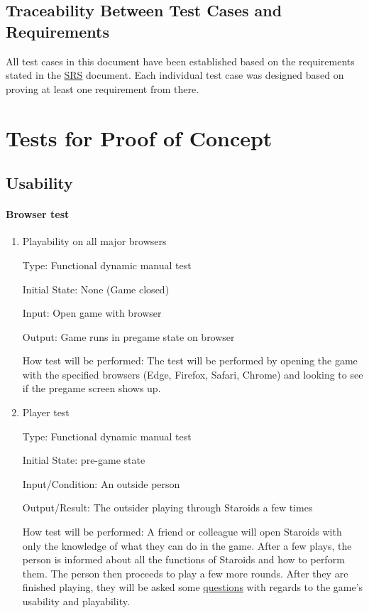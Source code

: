 \documentclass[12pt, titlepage]{article}
\begin{document}
\subsection{Traceability Between Test Cases and Requirements}
All test cases in this document have been established based on the requirements stated in the \href{https://gitlab.cas.mcmaster.ca/nagyj2/Staroids/blob/master/Doc/SRS/SRS.pdf}{SRS} document. Each individual test case was designed based on proving at least one requirement from there.

\section{Tests for Proof of Concept}

\subsection{Usability}

\paragraph{Browser test}

\begin{enumerate}

\item{Playability on all major browsers\\}

Type: Functional dynamic manual test

Initial State: None (Game closed)

Input: Open game with browser

Output: Game runs in pregame state on browser

How test will be performed: The test will be performed by opening the game with the specified browsers (Edge, Firefox, Safari, Chrome) and looking to see if the pregame screen shows up.

\item{Player test\\}

Type: Functional dynamic manual test

Initial State: pre-game state

Input/Condition: An outside person

Output/Result: The outsider playing through Staroids a few times

How test will be performed: A friend or colleague will open Staroids with only the knowledge of what they can do in the game. After a few plays, the person is informed about all the functions of Staroids and how to perform them. The person then proceeds to play a few more rounds. After they are finished playing, they will be asked some \hyperref[interview:questions]{questions} with regards to the game's usability and playability.

\end{enumerate}
\end{document}

